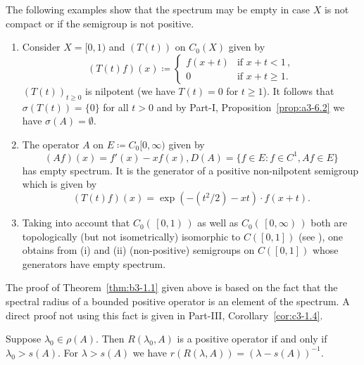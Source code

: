 The following examples show that the spectrum may be empty in case $X$ is not compact or if the semigroup is not positive.
\begin{examples}\label{ex:b3-1.2}
%
\begin{enumerate}[\upshape (i), wide, labelindent=.25em]	
\item  
Consider $X = [0,1)$ and $(T(t))$ on $C_{0}(X)$ given by
%
\begin{equation}\label{eq:b3-1.7}
	(T(t)f)(x) \coloneqq \begin{cases} 
		f(x+t) & \text{if } x+t < 1\,, \\
		0 & \text{if } x+t \geq 1.
	\end{cases}
\end{equation}
$(T(t))_{t\geq 0}$ is nilpotent (we have $T(t) = 0$ for $t \geq 1$).
It follows that $\sigma(T(t)) = \{0\}$ for all $t > 0$ and by Part-I, Proposition~\ref{prop:a3-6.2} we have $\sigma(A) = \emptyset$.

\item 
The operator $A$ on $E \coloneqq C_{0}[0,\infty)$ given by
\begin{equation}\label{eq:b3-1.8}
	(Af)(x) = f'(x) - xf(x), D(A) = \{f \in E \colon f \in C^1, Af \in E\}
\end{equation}
has empty spectrum.
It is the generator of a positive non-nilpotent semigroup which is given by
\begin{equation}\label{eq:b3-1.9}
	(T(t)f)(x) = \exp(-(t^2/2) - xt) \cdot f(x+t).
\end{equation}
	
\item 
Taking into account that $C_{0}( \, \left[ 0 , 1\right) \, )$ as well as 
$C_{0}( \, \left[ 0 , \infty \right) \, )$ both are topologically (but not isometrically) isomorphic to $C(\left[0,1\right])$ (see \textcite[Section~21.5]{semadeni:1971}), one obtains from (i) and (ii) (non-positive) semigroups on $C(\left[0,1\right])$ whose generators have empty spectrum.
\end{enumerate}
\end{examples}
The proof of Theorem~\ref{thm:b3-1.1} given above is based on the fact that the spectral radius of a bounded positive operator is an element of the spectrum.
A direct proof not using this fact is given in Part-III, Corollary~\ref{cor:c3-1.4}.
\begin{corollary}\label{cor:b3-1.3}
	Suppose $\lambda_0 \in \rho(A)$.
	Then $R(\lambda_0,A)$ is a positive operator if and only if\/ $\lambda_0 > s(A)$.
	For $\lambda > s(A)$ we have $r(R(\lambda,A)) = (\lambda - s(A))^{-1}$.
\end{corollary}
